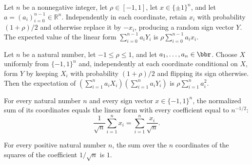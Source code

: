 \begin{theorem}
\label{FABL.pmfExpectation_noiseKernel_linearForm}
\leanok
{}
Let $n$ be a nonnegative integer, let $\rho\in[-1,1]$, let $x\in\{\pm1\}^n$, and let
$a=(a_i)_{i=0}^{n-1}\in\mathbb{R}^n$. Independently in each coordinate, retain $x_i$
with probability $(1+\rho)/2$ and otherwise replace it by $-x_i$, producing a random
sign vector $Y$. The expected value of the linear form $\sum_{i=0}^{n-1}a_iY_i$ is
$\rho\sum_{i=0}^{n-1}a_ix_i$.
\end{theorem}

\begin{theorem}
\label{FABL.pmfExpectation_correlatedPairPMF_linearForm_mul}
\leanok
{}
Let $n$ be a natural number, let $-1\leq\rho\leq1$, and let $a_1,\ldots,a_n\in\bbr$.
Choose $X$ uniformly from $\{-1,1\}^n$ and, independently at each coordinate conditional
on $X$, form $Y$ by keeping $X_i$ with probability $(1+\rho)/2$ and flipping its sign
otherwise. Then the expectation of $(\sum_{i=1}^n a_iX_i)(\sum_{i=1}^n a_iY_i)$ is
$\rho\sum_{i=1}^n a_i^2$.
\end{theorem}

\begin{theorem}
\label{FABL.normalizedMargin_eq_linearForm}
\leanok
{}
For every natural number $n$ and every sign vector $x\in\{-1,1\}^n$, the normalized sum
of its coordinates equals the linear form with every coefficient equal to $n^{-1/2}$:
\[\frac{1}{\sqrt n}\sum_{i=1}^n x_i=\sum_{i=1}^n\frac{x_i}{\sqrt n}.\]
\end{theorem}

\begin{theorem}
\label{FABL.sum_normalizedCoefficient_sq}
\leanok
{}
For every positive natural number $n$, the sum over the $n$ coordinates of the squares
of the coefficient $1/\sqrt n$ is $1$.
\end{theorem}

